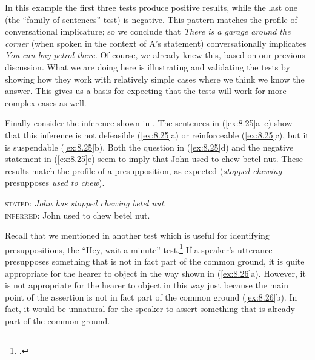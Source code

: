 In this example the first three tests produce positive results, while the last one (the “family of sentences” test) is negative. This pattern matches the profile of conversational implicature; so we conclude that \textit{There is a garage around the corner} (when spoken in the context of A’s statement) conversationally implicates \textit{You can buy petrol there}. Of course, we already knew this, based on our previous discussion. What we are doing here is illustrating and validating the tests by showing how they work with relatively simple cases where we think we know the answer. This gives us a basis for expecting that the tests will work for more complex cases as well.



Finally consider the inference shown in . The sentences in (\ref{ex:8.25}a--c) show that this inference is not defeasible (\ref{ex:8.25}a) or reinforceable (\ref{ex:8.25}c), but it is suspendable (\ref{ex:8.25}b). Both the question in (\ref{ex:8.25}d) and the negative statement in (\ref{ex:8.25}e) seem to imply that John used to chew betel nut. These results match the profile of a presupposition, as expected (\textit{stopped chewing} presupposes \textit{used to chew}).

\ea \label{ex:8.25}
\textsc{stated}: \textit{John has stopped chewing betel nut}.\\
\textsc{inferred}: John used to chew betel nut.\\




  \z
\z

\judgewidth{*}

Recall that we mentioned in  another test which is useful for identifying presuppositions, the “Hey, wait a minute” test.\footnote{.} If a speaker’s utterance presupposes something that is not in fact part of the common ground, it is quite appropriate for the hearer to object in the way shown in (\ref{ex:8.26}a). However, it is not appropriate for the hearer to object in this way just because the main point of the assertion is not in fact part of the common ground (\ref{ex:8.26}b). In fact, it would be unnatural for the speaker to assert something that is already part of the common ground.

